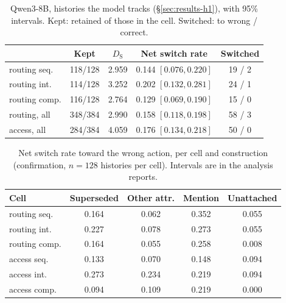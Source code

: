 \begin{table}[t]
\centering
\small
\setlength{\tabcolsep}{3pt}
\begin{tabular}{@{}lcccc@{}}
\toprule
& Kept & $D_{\mathrm{S}}$ & Net switch rate & Switched \\
\midrule
routing seq.  & 118/128 & 2.959 & 0.144 $[0.076, 0.220]$ & 19 / 2 \\
routing int.  & 114/128 & 3.252 & 0.202 $[0.132, 0.281]$ & 24 / 1 \\
routing comp. & 116/128 & 2.764 & 0.129 $[0.069, 0.190]$ & 15 / 0 \\
routing, all  & 348/384 & 2.990 & 0.158 $[0.118, 0.198]$ & 58 / 3 \\
\midrule
access, all   & 284/384 & 4.059 & 0.176 $[0.134, 0.218]$ & 50 / 0 \\
\bottomrule
\end{tabular}
\caption{Qwen3-8B, histories the model tracks (\S\ref{sec:results-h1}), with 95\% intervals. Kept: retained of those in the cell. Switched: to wrong / correct.}
\label{tab:joint}
\end{table}

\begin{table}[t]
\centering
\small
\setlength{\tabcolsep}{3pt}
\begin{tabular}{@{}lcccc@{}}
\toprule
Cell & Superseded & Other attr. & Mention & Unattached \\
\midrule
routing seq.  & 0.164 & 0.062 & 0.352 & 0.055 \\
routing int.  & 0.227 & 0.078 & 0.273 & 0.055 \\
routing comp. & 0.164 & 0.055 & 0.258 & 0.008 \\
\midrule
access seq.   & 0.133 & 0.070 & 0.148 & 0.094 \\
access int.   & 0.273 & 0.234 & 0.219 & 0.094 \\
access comp.  & 0.094 & 0.109 & 0.219 & 0.000 \\
\bottomrule
\end{tabular}
\caption{Net switch rate toward the wrong action, per cell and construction (confirmation, $n = 128$
histories per cell). Intervals are in the analysis reports.}
\label{tab:switch-cells}
\end{table}

